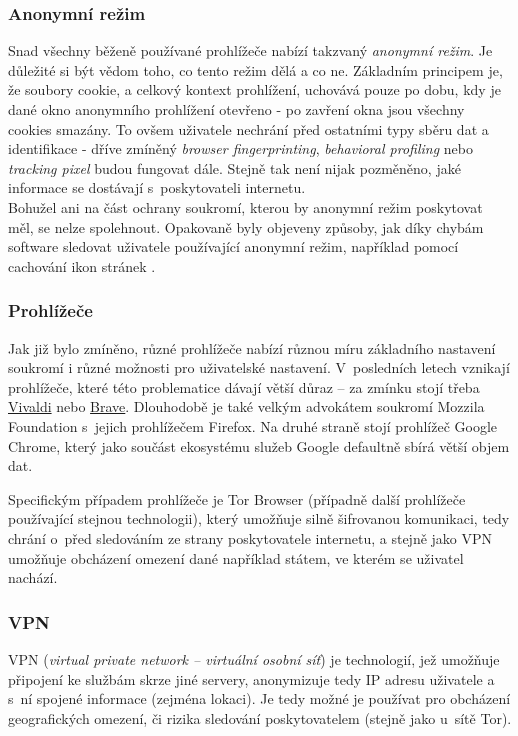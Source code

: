 \subsubsection*{Anonymní režim}
Snad všechny běženě používané prohlížeče nabízí takzvaný \textit{anonymní režim}. Je důležité si být vědom toho, co tento režim dělá a co ne.
Základním principem je, že soubory cookie, a celkový kontext prohlížení, uchovává pouze po dobu, kdy je dané okno anonymního prohlížení otevřeno - po zavření okna jsou všechny cookies smazány. To ovšem uživatele nechrání před ostatními typy sběru dat a identifikace - dříve zmíněný \textit{browser fingerprinting}, \textit{behavioral profiling} nebo \textit{tracking pixel} budou fungovat dále. Stejně tak není nijak pozměněno, jaké informace se dostávají s~poskytovateli internetu.\\

Bohužel ani na část ochrany soukromí, kterou by anonymní režim poskytovat měl, se nelze spolehnout. Opakovaně byly objeveny způsoby, jak díky chybám software sledovat uživatele používající anonymní režim, například pomocí cachování ikon stránek \citep{incognito-tracking}.

\subsubsection*{Prohlížeče}
Jak již bylo zmíněno, různé prohlížeče nabízí různou míru základního nastavení soukromí i různé možnosti pro uživatelské nastavení.
V~posledních letech vznikají prohlížeče, které této problematice dávají větší důraz -- za zmínku stojí třeba \href{https://vivaldi.com}{Vivaldi} nebo \href{https://brave.com}{Brave}. Dlouhodobě je také velkým advokátem soukromí Mozzila Foundation s~jejich prohlížečem Firefox.
Na druhé straně stojí prohlížeč Google Chrome, který jako součást ekosystému služeb Google defaultně sbírá větší objem dat.


Specifickým případem prohlížeče je Tor Browser (případně další prohlížeče používající stejnou technologii), který umožňuje silně šifrovanou komunikaci, tedy chrání o~před sledováním ze strany poskytovatele internetu, a stejně jako VPN umožňuje obcházení omezení dané například státem, ve kterém se uživatel nachází.  

\subsubsection*{VPN}
VPN (\textit{virtual private network -- virtuální osobní síť}) je technologií, jež umožňuje připojení ke službám skrze jiné servery, anonymizuje tedy IP adresu uživatele a s~ní spojené informace (zejména lokaci). Je tedy možné je používat pro obcházení geografických omezení, či rizika sledování poskytovatelem (stejně jako u~sítě Tor).

